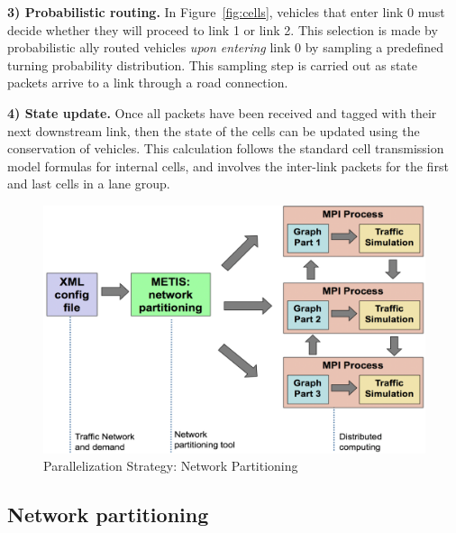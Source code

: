 \vspace{1em}\noindent \textbf{3) Probabilistic routing.} 
In Figure~\ref{fig:cells}, vehicles that enter link 0 must decide whether they will proceed to link 1 or link 2. This selection is made by probabilistic ally routed vehicles \textit{upon entering} link 0 by sampling a predefined turning probability distribution. This sampling step is carried out as state packets arrive to a link through a road connection. 

\vspace{1em} \noindent \textbf{4) State update.} Once all packets have been received and tagged with their next downstream link, then the state of the cells can be updated using the conservation of vehicles. This calculation follows the standard cell transmission model formulas for internal cells, and involves the inter-link packets for the first and last cells in a lane group. 

\begin{figure}[h!]
    \centering
    \includegraphics[width=\columnwidth]{figs/Methodology.png}
    \caption{Parallelization Strategy: Network Partitioning}
    \label{fig:Parallel_Strategy}
\end{figure}

\subsection{Network partitioning}

